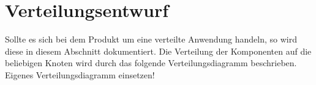 \chapter{Verteilungsentwurf}
Sollte es sich bei dem Produkt um eine verteilte Anwendung handeln, so wird
diese in diesem Abschnitt dokumentiert. Die Verteilung der Komponenten auf die
beliebigen Knoten wird durch das folgende Verteilungsdiagramm beschrieben.\\



Eigenes Verteilungsdiagramm einsetzen!
